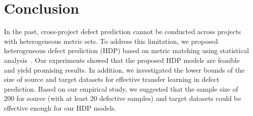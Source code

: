\section{Conclusion}
\label{sec:Conclusion}

In the past, cross-project defect prediction cannot be conducted across projects
with heterogeneous metric sets. To address
this limitation, we proposed heterogeneous defect prediction (HDP) based on
metric matching using statistical analysis~\cite{Massey51}. Our experiments
showed that the proposed HDP models are feasible and yield promising results. In addition, we investigated the lower bounds of the size of source and target datasets for effective transfer learning in defect prediction. Based on our empirical study, we suggested that the sample size of 200 for source (with at least 20 defective samples) and target datasets could be effective enough for our HDP models.




